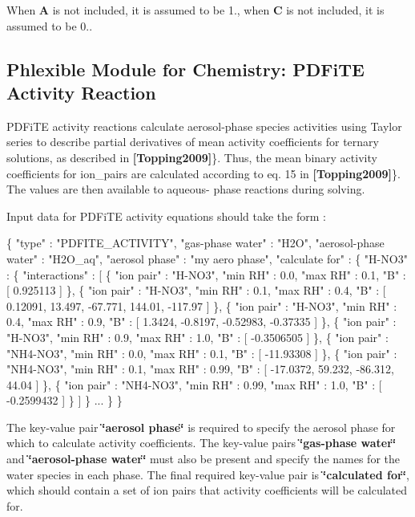 When {\bfseries A} is not included, it is assumed to be 1., when {\bfseries C} is not included, it is assumed to be 0.. \hypertarget{phlex_rxn_PDFiTE_activity}{}\subsection{Phlexible Module for Chemistry\+: P\+D\+Fi\+TE Activity Reaction}\label{phlex_rxn_PDFiTE_activity}
P\+D\+Fi\+TE activity reactions calculate aerosol-\/phase species activities using Taylor series to describe partial derivatives of mean activity coefficients for ternary solutions, as described in {\bfseries [Topping2009]}\}. Thus, the mean binary activity coefficients for ion\+\_\+pairs are calculated according to eq. 15 in {\bfseries [Topping2009]}\}. The values are then available to aqueous-\/ phase reactions during solving.

Input data for P\+D\+Fi\+TE activity equations should take the form \+: 
\begin{DoxyCode}
\{
  "type" : "PDFITE\_ACTIVITY",
  "gas-phase water" : "H2O",
  "aerosol-phase water" : "H2O\_aq",
  "aerosol phase" : "my aero phase",
  "calculate for" : \{
    "H-NO3" : \{
      "interactions" : [
        \{
          "ion pair" : "H-NO3",
          "min RH" : 0.0,
          "max RH" : 0.1,
          "B" : [ 0.925113 ]
        \},
        \{
          "ion pair" : "H-NO3",
          "min RH" : 0.1,
          "max RH" : 0.4,
          "B" : [ 0.12091, 13.497, -67.771, 144.01, -117.97 ]
        \},
        \{
          "ion pair" : "H-NO3",
          "min RH" : 0.4,
          "max RH" : 0.9,
          "B" : [ 1.3424, -0.8197, -0.52983, -0.37335 ]
        \},
        \{
          "ion pair" : "H-NO3",
          "min RH" : 0.9,
          "max RH" : 1.0,
          "B" : [ -0.3506505 ] 
        \},
        \{
          "ion pair" : "NH4-NO3",
          "min RH" : 0.0,
          "max RH" : 0.1,
          "B" : [ -11.93308 ]
        \},
        \{
          "ion pair" : "NH4-NO3",
          "min RH" : 0.1,
          "max RH" : 0.99,
          "B" : [ -17.0372, 59.232, -86.312, 44.04 ]
        \},
        \{
          "ion pair" : "NH4-NO3",
          "min RH" : 0.99,
          "max RH" : 1.0,
          "B" : [ -0.2599432 ] 
        \}
      ]
    \}
    ...
  \}
\}
\end{DoxyCode}
 The key-\/value pair {\bfseries \char`\"{}aerosol phase\char`\"{}} is required to specify the aerosol phase for which to calculate activity coefficients. The key-\/value pairs {\bfseries \char`\"{}gas-\/phase water\char`\"{}} and {\bfseries \char`\"{}aerosol-\/phase water\char`\"{}} must also be present and specify the names for the water species in each phase. The final required key-\/value pair is {\bfseries \char`\"{}calculated for\char`\"{}}, which should contain a set of ion pairs that activity coefficients will be calculated for.

